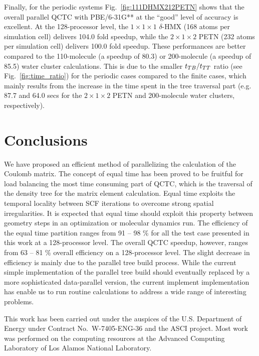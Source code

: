 \commentoutA{\documentclass[prl,aps,twocolumn,twocolumngrid,superbib]{revtex4}}
\begin{document}
Finally, for the periodic systems Fig.~\ref{fig:111DHMX212PETN} shows
that the overall parallel QCTC with PBE/6-31G** at the ``good'' level
of accuracy is excellent. At the 128-processor level, the $1\times
1\times 1$ $\delta$-HMX (168 atoms per simulation cell) delivers 104.0
fold speedup, while the $2\times 1 \times 2$ PETN (232 atoms per
simulation cell) delivers 100.0 fold speedup. These performances are
better compared to the 110-molecule (a speedup of 80.3) or
200-molecule (a speedup of 85.5) water cluster calculations. This is
due to the smaller $t_{TB}/t_{TT}$ ratio (see Fig.~\ref{fig:time_ratio})
for the periodic cases compared to the finite cases, which mainly
results from the increase in the time spent in the tree traversal part
(e.g. 87.7 and 64.0 secs for the $2\times 1 \times 2$ PETN and
200-molecule water clusters, respectively).

\section{Conclusions}
\label{conclusions}
We have proposed an efficient method of parallelizing the calculation
of the Coulomb matrix. The concept of equal time has been proved to be
fruitful for load balancing the most time consuming part of QCTC,
which is the traversal of the density tree for the matrix element
calculation.  Equal time exploits the temporal locality between SCF
iterations to overcome strong spatial irregularities. It is expected
that equal time should exploit this property between geometry steps in
an optimization or molecular dynamics run.  The efficiency of the
equal time partition ranges from 91 -- 98 \% for all the test case
presented in this work at a 128-processor level. The overall QCTC
speedup, however, ranges from 63 -- 81 \% overall efficiency on a
128-processor level. The slight decrease in efficiency is mainly due
to the parallel tree build process.  While the current simple
implementation of the parallel tree build should eventually replaced
by a more sophisticated data-parallel version, the current implement
implementation has enable us to run routine calculations to address a
wide range of interesting problems.

\begin{acknowledgments}
This work has been carried out under the auspices of the
U.S. Department of Energy under Contract No.~W-7405-ENG-36 and the
ASCI project.  Most work was performed on the computing resources at
the Advanced Computing Laboratory of Los Alamos National Laboratory.
\end{acknowledgments}

 
\end{document}
